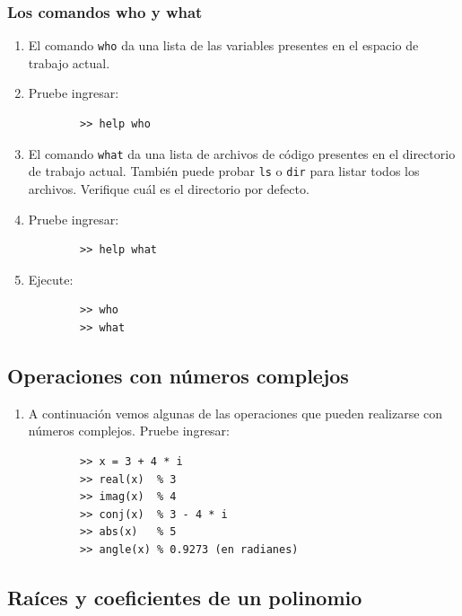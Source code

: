\subsubsection{Los comandos who y what}

\begin{enumerate}
	\item El comando \texttt{who} da una lista de las variables presentes en el espacio de trabajo actual.
	\item Pruebe ingresar:
	\begin{verbatim}
		>> help who
	\end{verbatim}
	
	\item El comando \texttt{what} da una lista de archivos de código presentes en el directorio de trabajo actual. También puede probar \texttt{ls} o \texttt{dir} para listar todos los archivos. Verifique cuál es el directorio por defecto.
	\item Pruebe ingresar:
	\begin{verbatim}
		>> help what
	\end{verbatim}
	
	\item Ejecute:
	\begin{verbatim}
		>> who
		>> what
	\end{verbatim}
\end{enumerate}

\subsection{Operaciones con números complejos}

\begin{enumerate}
	\item A continuación vemos algunas de las operaciones que pueden realizarse con números complejos. Pruebe ingresar:
	\begin{verbatim}
		>> x = 3 + 4 * i
		>> real(x)  % 3
		>> imag(x)  % 4
		>> conj(x)  % 3 - 4 * i
		>> abs(x)   % 5
		>> angle(x) % 0.9273 (en radianes)
	\end{verbatim}
\end{enumerate}

\subsection{Raíces y coeficientes de un polinomio}

